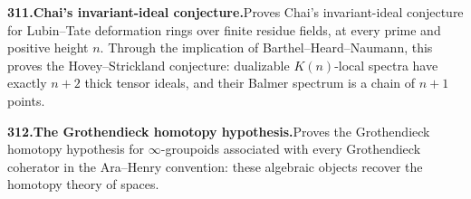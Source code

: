 \documentclass[11pt,a4paper]{article}
\begin{document}
  \par \begin{minipage}{\linewidth}
  \fontsize{10.5}{12.6}\selectfont\RaggedRight
  \hypertarget{result 311}{}
  {\bfseries\textcolor{muted}{311.}\enspace Chai's invariant-ideal conjecture.}\enspace Proves Chai's invariant-ideal conjecture for Lubin--Tate deformation rings over finite residue fields, at every prime and positive height $n$. Through the implication of Barthel--Heard--Naumann, this proves the Hovey--Strickland conjecture: dualizable $K(n)$-local spectra have exactly $n+2$ thick tensor ideals, and their Balmer spectrum is a chain of $n+1$ points.\par
  \end{minipage}\par\vspace{5pt}



  \par \begin{minipage}{\linewidth}
  \fontsize{10.5}{12.6}\selectfont\RaggedRight
  \hypertarget{result 312}{}
  {\bfseries\textcolor{muted}{312.}\enspace The Grothendieck homotopy hypothesis.}\enspace Proves the Grothendieck homotopy hypothesis for $\infty$-groupoids associated with every Grothendieck coherator in the Ara--Henry convention: these algebraic objects recover the homotopy theory of spaces.\par
  \end{minipage}\par\vspace{5pt}
\end{document}
